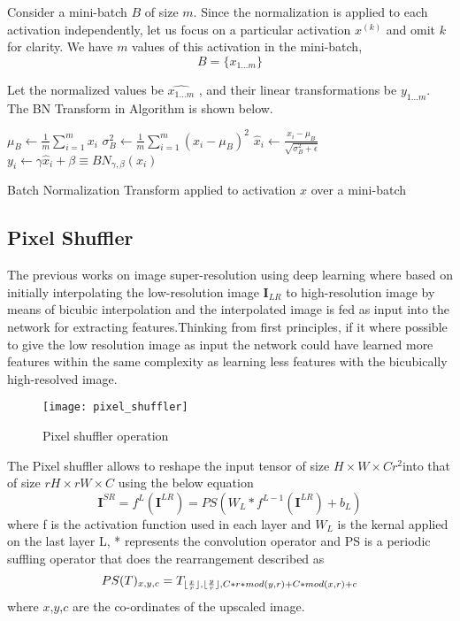 Consider a mini-batch $B$ of size $m$. Since the normalization is applied to each activation independently, let us focus on a particular activation $x^{(k)}$ and omit $k$ for clarity. We have $m$ values of this activation in the mini-batch,
\begin{equation}
 B = \{x_{1 \dots m}\}
\end{equation}

Let the normalized values be $\hat{x_{1 \dots m }}$ , and their linear transformations  be $y_{1 \dots m}$. The BN Transform in Algorithm is shown below.

\begin{algorithm}[H]
\DontPrintSemicolon
{}
$\mu_B \leftarrow \frac{1}{m}\sum_{i=1}^{m}x_i$
$\sigma_B^2 \leftarrow \frac{1}{m}\sum_{i=1}^{m}(x_i - \mu_B)^2$  
$\hat x_i \leftarrow \frac{x_i - \mu_B}{\sqrt{\sigma_B^2 + \epsilon}}$  
$y_i \leftarrow \gamma\hat x_i + \beta \equiv BN_{\gamma,\beta}(x_i) $  
\caption{Batch Normalization Transform applied to activation $x$ over a mini-batch}
\label{algo:batchnorm}
\end{algorithm}

\subsection{Pixel Shuffler}
The previous works on image super-resolution using deep learning  where based on initially interpolating the low-resolution image $\textbf{I}_{LR}$ to high-resolution image by means of bicubic interpolation and the interpolated image is fed as input into the network for extracting features.Thinking from first principles, if it where possible to give the low resolution image as input the network could have learned more features within the same complexity as learning less features with the bicubically high-resolved image.
\begin{figure}[h!]
 \centering
 \texttt{[image: pixel\_shuffler]}
 \caption{Pixel shuffler operation}
 \label{fig:pixelshuffler}
\end{figure}

The Pixel shuffler allows to reshape the input tensor of size $ H \times W \times Cr^2 $into that of size $rH \times rW \times C$ using the below equation
\begin{equation}
\textbf{I}^{SR} = f^L(\textbf{I}^{LR}) = PS(W_L * f^{L-1}(\textbf{I}^{LR}) + b_L)
\end{equation}
where f is the activation function used in each layer and $W_L$ is the kernal applied on the last layer L, * represents the convolution operator and  PS is a periodic suffling operator that does the rearrangement described as
\begin{equation}
PS(T)_{x,y,c} = T_{\lfloor\frac{x}{r}\rfloor,\lfloor\frac{y}{r}\rfloor,C*r*mod(y,r) + C*mod(x,r)+c}
\end{equation}
where $x$,$y$,$c$ are the co-ordinates of the upscaled image.

